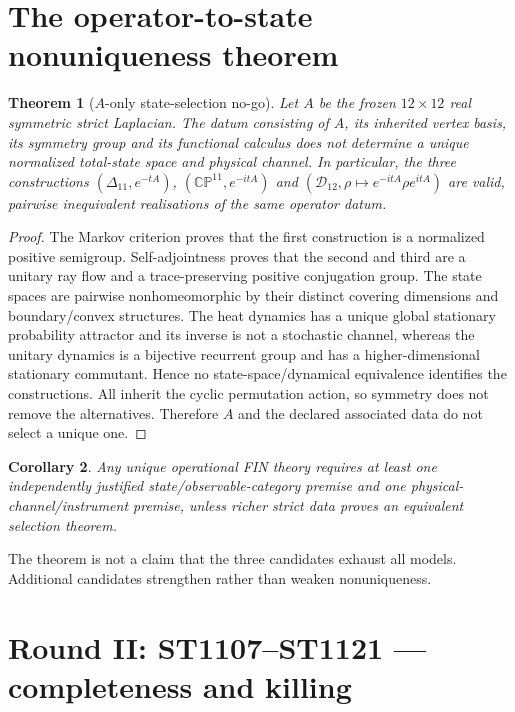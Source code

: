 \documentclass[11pt,a4paper]{article}
\newtheorem{theorem}{Theorem}
\newtheorem{corollary}[theorem]{Corollary}
\newcommand{\Dclass}{\Delta_{11}}
\newcommand{\Drho}{\mathcal D_{12}}
\begin{document}
\section{The operator-to-state nonuniqueness theorem}

\begin{theorem}[$A$-only state-selection no-go]
Let $A$ be the frozen $12\times12$ real symmetric strict Laplacian.  The datum
consisting of $A$, its inherited vertex basis, its symmetry group and its
functional calculus does not determine a unique normalized total-state space
and physical channel.  In particular, the three constructions
$(\Dclass,e^{-tA})$, $(\mathbb{CP}^{11},e^{-itA})$ and
$(\Drho,\rho\mapsto e^{-itA}\rho e^{itA})$ are valid, pairwise inequivalent
realisations of the same operator datum.
\end{theorem}

\begin{proof}
The Markov criterion proves that the first construction is a normalized
positive semigroup.  Self-adjointness proves that the second and third are a
unitary ray flow and a trace-preserving positive conjugation group.  The state
spaces are pairwise nonhomeomorphic by their distinct covering dimensions and
boundary/convex structures.  The heat dynamics has a unique global stationary
probability attractor and its inverse is not a stochastic channel, whereas the
unitary dynamics is a bijective recurrent group and has a higher-dimensional
stationary commutant.  Hence no state-space/dynamical equivalence identifies
the constructions.  All inherit the cyclic permutation action, so symmetry
does not remove the alternatives.  Therefore $A$ and the declared associated
data do not select a unique one.
\end{proof}

\begin{corollary}
Any unique operational FIN theory requires at least one independently justified
state/observable-category premise and one physical-channel/instrument premise,
unless richer strict data proves an equivalent selection theorem.
\end{corollary}

The theorem is not a claim that the three candidates exhaust all models.
Additional candidates strengthen rather than weaken nonuniqueness.

\section{Round II: ST1107--ST1121 --- completeness and killing}
\end{document}
